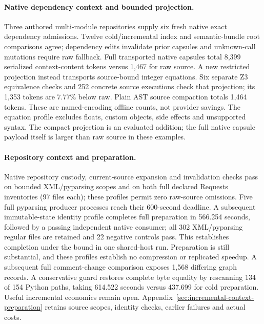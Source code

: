\paragraph{Native dependency context and bounded projection.}
Three authored multi-module repositories supply six fresh native exact
dependency admissions. Twelve cold/incremental index and semantic-bundle root
comparisons agree; dependency edits invalidate prior capsules and unknown-call
mutations require raw fallback. Full transported native capsules total
8,399 serialized context-content
tokens versus 1,467 for raw source. A new restricted projection instead
transports source-bound integer equations. Six separate Z3 equivalence checks
and 252 concrete source executions check that projection; its 1,353
tokens are 7.77\% below raw. Plain AST source compaction totals
1,464 tokens. These are named-encoding offline counts, not provider savings.
The equation profile excludes floats, custom objects, side effects and unsupported
syntax. The compact projection is an evaluated addition; the full native capsule
payload itself is larger than raw source in these examples.

\paragraph{Repository context and preparation.}
Native repository custody, current-source expansion and invalidation checks
pass on bounded XML/pyparsing scopes and on both full declared Requests
inventories (97 files each); these profiles permit zero raw-source omissions.
Five full pyparsing producer processes reach their 600-second deadline. A
subsequent immutable-state identity profile completes full preparation in
566.254 seconds, followed by a passing independent native consumer; all
302 XML/pyparsing regular files are retained and 22 negative controls pass.
This establishes completion under the bound in one shared-host run. Preparation
is still substantial, and these profiles establish no compression or replicated
speedup. A subsequent full comment-change comparison exposes 1,568 differing
graph records. A conservative guard restores complete byte equality by
rescanning 134 of 154 Python paths, taking 614.522 seconds versus 437.699 for
cold preparation. Useful incremental economics remain open.
Appendix~\ref{sec:incremental-context-preparation} retains source scopes,
identity checks, earlier failures and actual costs.

